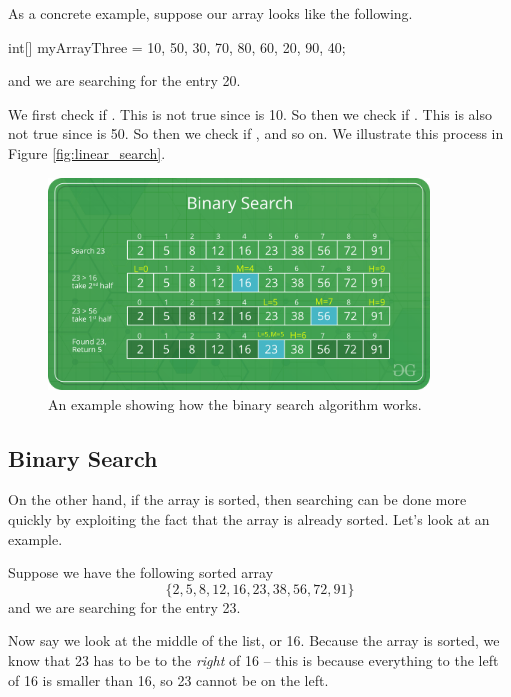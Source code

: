 As a concrete example, suppose our array looks like the following.
 \begin{code}
int[] myArrayThree = {10, 50, 30, 70, 80, 60, 20, 90, 40};
\end{code}
and we are searching for the entry 20. 

We first check if . This is not true since  is 10. So then we check if . This is also not true since  is 50. So then we check if , and so on. We illustrate this process in Figure \ref{fig:linear_search}.

 
   \begin{figure}
    \centering
    \includegraphics[width=0.9\textwidth]{images/Binary-Search.png}
    \caption{An example showing how the binary search algorithm works.}
    \label{fig:binary_search}
\end{figure}
 
 \subsection{Binary Search}
 On the other hand, if the array is sorted, then searching can be done more quickly by exploiting the fact that the array is already sorted. Let's look at an example.
 
 Suppose we have the following sorted array
 \begin{equation*}
     \{2, 5, 8, 12, 16, 23, 38, 56, 72, 91\}
 \end{equation*}
 and we are searching for the entry 23. 

Now say we look at the middle of the list, or 16. Because the array is sorted, we know that 23 has to be to the \emph{right} of 16 -- this is because everything to the left of 16 is smaller than 16, so 23 cannot be on the left.

